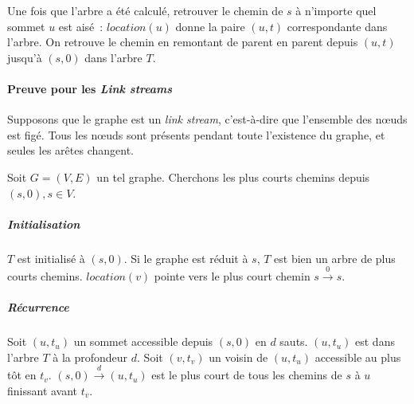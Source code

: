 \documentclass[12pt,a4paper]{article}
\begin{document}
Une fois que l'arbre a été calculé, retrouver le chemin de \(s\) à
n'importe quel sommet \(u\) est aisé~: \(location(u)\) donne la paire
\((u, t)\) correspondante dans l'arbre. On retrouve le chemin en
remontant de parent en parent depuis \((u, t)\) jusqu'à \((s, 0)\)
dans l'arbre \(T\).

\paragraph{Preuve pour les \textit{Link streams}} Supposons que le
graphe est un \textit{link stream}, c'est-à-dire que l'ensemble des
nœuds est figé. Tous les nœuds sont présents pendant toute l'existence
du graphe, et seules les arêtes changent.

Soit \(G = (V, E)\) un tel graphe. Cherchons les plus courts chemins
depuis \((s, 0), s \in V\).

\subparagraph{Initialisation} \(T\) est initialisé à \((s, 0)\). Si le
graphe est réduit à \(s\), \(T\) est bien un arbre de plus courts
chemins. \(location(v)\) pointe vers le plus court chemin
\(s \xrightarrow{0} s\).

\subparagraph{Récurrence} Soit \((u, t_u)\) un sommet accessible
depuis \((s, 0)\) en \(d\) sauts. \((u, t_u)\) est dans l'arbre \(T\)
à la profondeur \(d\). Soit \((v, t_v)\) un voisin de \((u, t_u)\)
accessible au plus tôt en \(t_v\). \((s, 0) \xrightarrow{d} (u, t_u)\)
est le plus court de tous les chemins de \(s\) à \(u\) finissant avant
\(t_v\). \\
\end{document}
